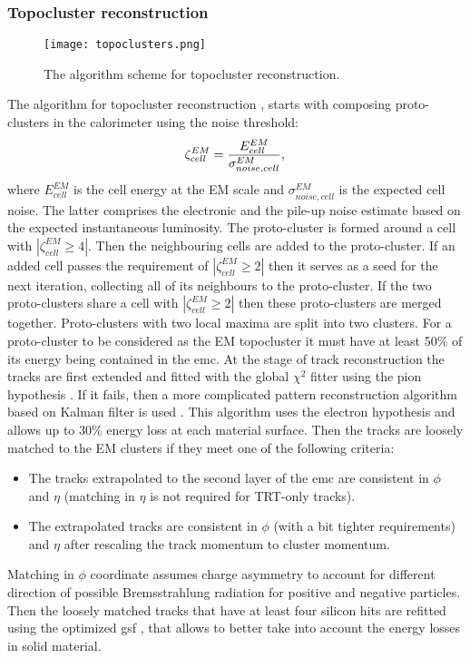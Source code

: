  	 \subsubsection{Topocluster reconstruction}
 	  	 	\label{sec::topocluster}
 	  	\begin{figure}[htbp]
 	 	\centering
 	 	\texttt{[image: topoclusters.png]}
 	 	\caption[topocluster]{The algorithm scheme for topocluster reconstruction.}
 	 	\label{fig::topocluster}
 	 \end{figure}
 	 The algorithm for topocluster reconstruction \cite{topoclust2_2016}, \cite{topoclust_2019} starts with composing proto-clusters in the calorimeter using the noise threshold:
 	 \begin{equation}
 	 	\zeta_{cell}^{EM} =\frac{E_{cell}^{EM}}{\sigma_{noise,cell}^{EM}},\\
 	 \end{equation}
 	 where $E_{cell}^{EM}$ is the cell energy at the EM scale and $\sigma_{noise,cell}^{EM}$ is the expected cell noise. The latter comprises the electronic and the pile-up noise estimate based on the expected instantaneous luminosity. The proto-cluster is formed around a cell with $|\zeta_{cell}^{EM} \ge 4|$. Then the neighbouring cells are added to the proto-cluster. If an added cell passes the requirement of $|\zeta_{cell}^{EM} \ge 2 |$ then it serves as a seed for the next iteration, collecting all of its neighbours to the proto-cluster. If the two proto-clusters share a cell with $|\zeta_{cell}^{EM} \ge 2|$ then these proto-clusters are merged together. Proto-clusters with two local maxima are split into two clusters. For a proto-cluster to be considered as the EM topocluster it must have at least 50\% of its energy being contained in the \gls{emc}.
 	At the stage of track reconstruction the tracks are first extended and fitted with the global $\chi^2$ fitter using the pion hypothesis \cite{Cornelissen:2008zza}. If it fails, then a more complicated pattern reconstruction algorithm based on Kalman filter is used \cite{Cornelissen:1020106}. This algorithm uses the electron hypothesis and allows up to 30\% energy loss at each material surface. Then the tracks are loosely matched to the EM clusters if they meet one of the following criteria:
 	\begin{itemize}
 		\item The tracks extrapolated to the second layer of the \gls{emc} are consistent in $\phi$ and $\eta$ (matching in $\eta$ is not required for TRT-only tracks). 
 		\item The extrapolated tracks are consistent in $\phi$ (with a bit tighter requirements) and $\eta$ after rescaling the track momentum to cluster momentum.
 	\end{itemize}
  	Matching in $\phi$ coordinate assumes charge asymmetry to account for different direction of possible Bremsstrahlung radiation for positive and negative particles. Then the loosely matched tracks that have at least four silicon hits are refitted using the optimized \gls{gsf} \cite{GSF}, that allows to better take into account the energy losses in solid material.\\

